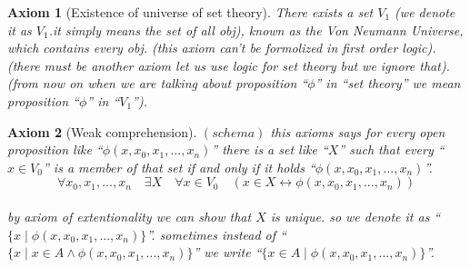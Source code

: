 \documentclass[10pt,a4paper]{book}
\newtheorem{axiom}{Axiom}[section]
\begin{document}
\begin{axiom}
    [Existence of universe of set theory]
    There exists a set $V_1$ (we denote it as $V_1$.it simply means the set of all obj), known as the Von Neumann Universe, which contains every obj.
    (this axiom can't be formolized in first order logic).
    (there must be another axiom let us use logic for set theory but we ignore that).
    (from now on when we are talking about proposition ``$\phi$'' in ``set theory'' we mean
    proposition ``$\phi$'' in ``$V_1$'').
\end{axiom}



\begin{axiom}
    [Weak comprehension] $(schema)$ this axioms says for every open proposition
    like ``$\phi (x,x_0 , x_1, ... , x_n)$'' there is a set like ``$X$'' such that every ``$x \in V_0$'' is a
    member of that set if and only if it holds
    ``$\phi (x,x_0 , x_1, ... , x_n)$''.
    \\
    \[ \forall x_0 , x_1, ... , x_n \quad \exists X \quad \forall x  \in V_0 \quad ( x \in X \leftrightarrow \phi (x,x_0 , x_1, ... , x_n) ) \]
    \\
    by axiom of extentionality we can show that $X$ is unique.
    so we denote it as ``$\{ x \mid  \phi (x,x_0 , x_1, ... , x_n)\}$''.
    sometimes instead of ``$\{ x \mid x \in A \land \phi (x,x_0 , x_1, ... , x_n)\}$'' we write
    ``$\{ x \in A \mid  \phi (x,x_0 , x_1, ... , x_n)\}$''.
\end{axiom}


\end{document}
